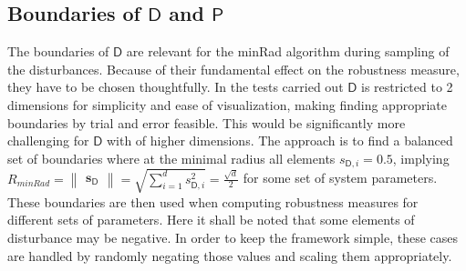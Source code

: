 


\subsection{Boundaries of $\mathsf{D}$ and $\mathsf{P}$ } \label{bounds}

    The boundaries of $\mathsf{D}$ are relevant for the minRad algorithm during sampling of the disturbances. Because of their fundamental effect on the robustness measure, they have to be chosen thoughtfully. In the tests carried out $\mathsf{D}$ is restricted to 2 dimensions for simplicity and ease of visualization, making finding appropriate boundaries by trial and error feasible. This would be significantly more challenging for $\mathsf{D}$ with of higher dimensions. The approach is to find a balanced set of boundaries where at the minimal radius all elements $s_{\mathsf{D},i} = 0.5$, implying $R_{minRad} = \begin{Vmatrix}\mathbf{s}_{\mathsf{D}}\end{Vmatrix}= \sqrt{\sum_{i=1}^{d} s_{\mathsf{D},i}^2} = \frac{\sqrt{d}}{2}$ for some set of system parameters. These boundaries are then used when computing robustness measures for different sets of parameters. 
    Here it shall be noted that some elements of disturbance may be negative. In order to keep the framework simple, these cases are handled by randomly negating those values and scaling them appropriately. 

 



